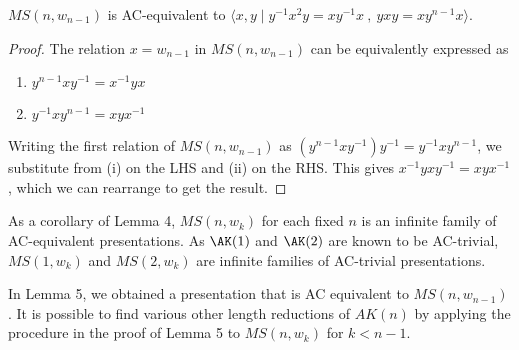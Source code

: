 \begin{lemma}
    $MS(n, w_{n-1})$ is AC-equivalent to $\langle x,y \mid y^{-1} x^2 y = x y^{-1} x \ , \ y x y = x y^{n-1} x \rangle$.
\end{lemma}

\begin{proof}
    The relation $x=w_{n-1}$ in $MS(n, w_{n-1})$ can be equivalently expressed as
    \begin{enumerate}[label=(\roman*)]
        \item $y^{n-1}xy^{-1}=x^{-1}yx$
        \item $y^{-1}xy^{n-1}=xyx^{-1}$
    \end{enumerate}
    Writing the first relation of $MS(n, w_{n-1})$ as  $(y^{n-1}xy^{-1})y^{-1}=y^{-1}xy^{n-1}$, we substitute from (i) on the LHS and (ii) on the RHS. This gives $x^{-1}yxy^{-1}=xyx^{-1}$, which we can rearrange to get the result.
\end{proof}

\begin{remark}
As a corollary of Lemma 4, $MS(n, w_k)$ for each fixed $n$ is an infinite family of AC-equivalent presentations. As $\AK(1)$ and $\AK(2)$ are known to be AC-trivial, $MS(1, w_k)$ and $MS(2, w_k)$ are infinite families of AC-trivial presentations.
\end{remark}

\begin{remark}
In Lemma 5, we obtained a presentation that is AC equivalent to $MS(n, w_{n-1})$. It is possible to find various other length reductions of $AK(n)$ by applying the procedure in the proof of Lemma 5 to $MS(n, w_k)$ for $k < n-1$. 
\end{remark}

